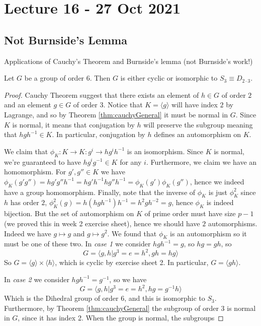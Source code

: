 \section{Lecture 16 - 27 Oct 2021}
\subsection{Not Burnside's Lemma}
Applications of Cauchy's Theorem and Burnside's lemma (not Burnside's work!)
\begin{example} 
  Let $G$ be a group of order $6$. Then $G$ is either cyclic or isomorphic to $S_3\equiv
  D_{2\cdot 3}$.
\end{example}
\begin{proof}
  Cauchy Theorem suggest that there exists an element of $h\in G$ of order $2$ and an
  element $g\in G$ of order $3$. Notice that $K=\langle g \rangle$ will have index $2$ by
  Lagrange, and so by Theorem \ref{thm:cauchyGeneral} it must be normal in $G$. Since $K$
  is normal, it means that conjugation by $h$ will preserve the subgroup meaning that
  $hgh^{-1}\in K$. In particular, conjugation by $h$ defines an automorphism on $K$. 

  We claim that $\phi_K:K\to K: g^i\to hg^ih^{-1}$ is an isomorphism. Since $K$ is normal,
  we're guaranteed to have $hg^ig^{-1}\in K$ for any $i$. Furthermore, we claim we have an
  homomorphism. For $g',g''\in K$ we have $\phi_K(g'g'')=hg'g''h^{-1}=
  hg'h^{-1}hg''h^{-1}=\phi_K(g')\phi_K(g'')$, hence we indeed have a group homomorphism.
  Finally, note that the inverse of $\phi_K$ is just $\phi_K^2$ since $h$ has order $2$,
  $\phi_K^2(g)=h(hgh^{-1})h^{-1}= h^2 g h^{-2} = g$, hence $\phi_K$ is indeed bijection. But
  the set of automorphism on $K$ of prime order must have size $p-1$ (we proved this in week
  2 exercise sheet), hence we should have $2$ automorphisms. Indeed we have $g\mapsto g$ and
  $g\mapsto g^2$. We found that $\phi_K$ is an automorphism so it must be one of these two.
  In \emph{case 1} we consider $hgh^{-1}=g$, so $hg=gh$, so 
  \[G=\langle g,h | g^3=e=h^2, gh=hg \rangle\]
  So $G=\langle g \rangle \times \langle h \rangle$, which is cyclic by exercise sheet 2.
  In particular, $G=\langle gh \rangle$.

  In \emph{case 2} we consider $hgh^{-1}=g^{-1}$, so we have
  \[G=\langle g,h | g^3=e=h^2, hg=g^{-1}h\rangle\]
  Which is the Dihedral group of order $6$, and this is isomorphic to $S_3$. Furthermore,
  by Theorem \ref{thm:cauchyGeneral} the subgroup of order $3$ is normal in $G$, since it
  has index 2. When the group is normal, the subgroups 
\end{proof}

